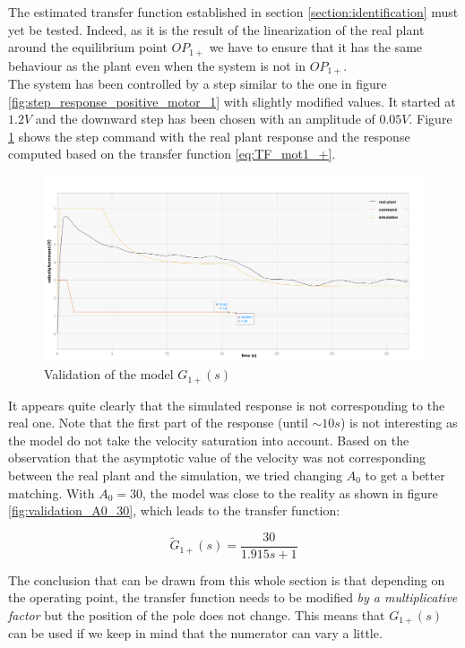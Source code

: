The estimated transfer function established in section \ref{section:identification} must yet be tested. Indeed, as it
is the result of the linearization of the real plant around the equilibrium point $OP_{1+}$ we have to ensure that it
has the same behaviour as the plant even when the system is not in $OP_{1+}$.\\

The system has been controlled by a step similar to the one in figure \ref{fig:step_response_positive_motor_1} with slightly
modified values. It started at $1.2 V$ and the downward step has been chosen with an amplitude of $0.05 V$. Figure 
\ref{fig:validation_A0_24} shows the step command with the real plant response and the response computed based on the
transfer function \ref{eq:TF_mot1_+}.

\begin{figure}[H]
    \centering
    \includegraphics[width=\textwidth]{Pictures/validation_A0_24.png}
    \caption{Validation of the model $G_{1+} (s)$}
    \label{fig:validation_A0_24}
\end{figure}

It appears quite clearly that the simulated response is not corresponding to the real one. Note that the first part of
the response (until $\sim 10s$) is not interesting as the model do not take the velocity saturation into account.
Based on the observation that the asymptotic value of the velocity was not corresponding between the real plant and the
simulation, we tried changing $A_0$ to get a better matching. With $A_0 = 30$, the model was close to the reality as 
shown in figure \ref{fig:validation_A0_30}, which leads to the transfer function:

\begin{equation}
    \tilde{G}_{1+}(s) = \frac{30}{1.915 s + 1}
\end{equation}

The conclusion that can be drawn from this whole section is that depending on the operating point, the transfer function
needs to be modified \textit{by a multiplicative factor} but the position of the pole does not change. This means that 
$G_{1+}(s)$ can be used if we keep in mind that the numerator can vary a little.

